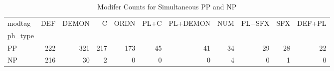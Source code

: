 \begin{table}[htbp!]
\centering
\caption{Modifer Counts for Simultaneous PP and NP}
\label{table:simmod_ct}
\begin{adjustbox}{width=1\textwidth}
\begin{tabular}{lrrrrrrrrrr}
\toprule
modtag &  DEF &  DEMON &    C &  ORDN &  PL+C &  PL+DEMON &  NUM &  PL+SFX &  SFX &  DEF+PL \\
ph\_type &      &        &      &       &       &           &      &         &      &         \\
\midrule
PP      &  222 &    321 &  217 &   173 &    45 &        41 &   34 &      29 &   28 &      22 \\
NP      &  216 &     30 &    2 &     0 &     0 &         0 &    4 &       0 &    1 &       0 \\
\bottomrule
\end{tabular}
\end{adjustbox}
\end{table}
